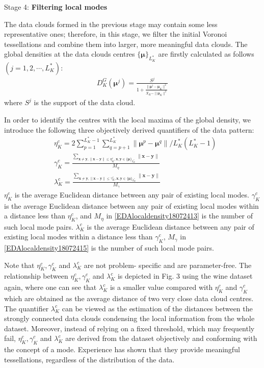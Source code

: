 Stage 4: \textbf{Filtering local modes}

The data clouds formed in the previous stage may contain some less representative ones; therefore, in this stage, we filter the initial Voronoi tessellations and combine them into larger, more meaningful data clouds.
The global densities at the data clouds centres $\{\bm\mu\}_{L_K^*}$ are firstly calculated as follows $( j = 1, 2, \cdots, L_K^*)$:
\begin{align}\label{EDAlocaldensity18072412}
 D^G_K(\bm\mu^j ) = \frac{S^j}{1 +\frac{\|\bm\mu^j-\bm\mu_K\|^2}{X_K-\|\bm \mu_K\|^2} }
\end{align}
where $S^j$ is the support of the data cloud.

In order to identify the centres with the local maxima of the global density, we introduce the following three objectively derived quantifiers of the data pattern:
\begin{align}
&\eta_K^c = 2\sum^{L^*_K-1}_{ p=1}\sum^{L^*_K}_{q=p+1} \|\bm \mu^p - \bm \mu^q\|  /L^*_K({L^*_K-1})\label{EDAlocaldensity18072413}\\
&\gamma_K^c =\frac{\sum\limits_{\bm x\neq \bm y, \|\bm x-\bm y\|\leq \eta_K^c,\bm x,\bm y\in \{\bm\mu\}_{L_K^*}}\|\bm x-\bm y\|}{M_\eta}\label{EDAlocaldensity18072414}\\
&\lambda_K^c =\frac{\sum\limits_{\bm x\neq \bm y, \|\bm x-\bm y\|\leq \gamma_K^c,\bm x,\bm y\in \{\bm\mu\}_{L_K^*}}\|\bm x-\bm y\|}{M_\gamma}\label{EDAlocaldensity18072415}
\end{align}
$\eta_K^c$ is the average Euclidean distance between any pair of existing local modes. $\gamma_K^c$ is the average Euclidean distance between any pair of existing local modes within a distance less than $\eta_K^c$, and $M_\eta$ in \eqref{EDAlocaldensity18072413} is the number of such local mode pairs. $\lambda_K^c$ is the average Euclidean distance between any pair of existing local modes within a distance less than $\gamma_K^c$, $M_\gamma$ in \eqref{EDAlocaldensity18072415} is the number of such local mode pairs.

Note that $\eta_K^c, \gamma_K^c$ and $\lambda_K^c$ are not problem- specific and are parameter-free. The relationship between $\eta_K^c, \gamma_K^c$ and $\lambda_K^c$ is depicted in Fig. 3 using the wine dataset \cite{AeberhardWinedata1992} again, where one can see that $\lambda_K^c$ is a smaller value compared with $\eta_K^c$ and $\gamma_K^c$ which are obtained as the average distance of two very close data cloud centres.
The quantifier $\lambda_K^c$ can be viewed as the estimation of the distances between the strongly connected data clouds condensing the local information from the whole dataset. Moreover, instead of relying on a fixed threshold, which may frequently fail, $\eta_K^c, \gamma_K^c$ and $\lambda_K^c$ are derived from the dataset objectively and conforming with the concept of a mode. Experience has shown that they provide meaningful tessellations, regardless of the distribution of the data.

